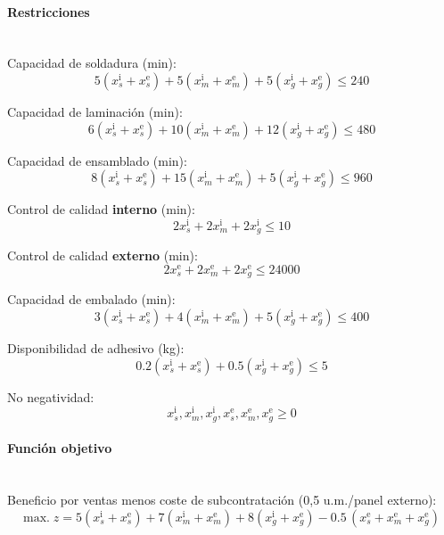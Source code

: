 \paragraph{Restricciones}\mbox{}\\
Capacidad de soldadura (min):
\begin{equation}
5(x_s^{\mathrm{i}}{+}x_s^{\mathrm{e}}) + 5(x_m^{\mathrm{i}}{+}x_m^{\mathrm{e}}) + 5(x_g^{\mathrm{i}}{+}x_g^{\mathrm{e}}) \le 240
\end{equation}

Capacidad de laminación (min):
\begin{equation}
6(x_s^{\mathrm{i}}{+}x_s^{\mathrm{e}}) + 10(x_m^{\mathrm{i}}{+}x_m^{\mathrm{e}}) + 12(x_g^{\mathrm{i}}{+}x_g^{\mathrm{e}}) \le 480
\end{equation}

Capacidad de ensamblado (min):
\begin{equation}
8(x_s^{\mathrm{i}}{+}x_s^{\mathrm{e}}) + 15(x_m^{\mathrm{i}}{+}x_m^{\mathrm{e}}) + 5(x_g^{\mathrm{i}}{+}x_g^{\mathrm{e}}) \le 960
\end{equation}

Control de calidad \textbf{interno} (min):
\begin{equation}
2x_s^{\mathrm{i}} + 2x_m^{\mathrm{i}} + 2x_g^{\mathrm{i}} \le 10
\end{equation}

Control de calidad \textbf{externo} (min):
\begin{equation}
2x_s^{\mathrm{e}} + 2x_m^{\mathrm{e}} + 2x_g^{\mathrm{e}} \le 24000
\end{equation}

Capacidad de embalado (min):
\begin{equation}
3(x_s^{\mathrm{i}}{+}x_s^{\mathrm{e}}) + 4(x_m^{\mathrm{i}}{+}x_m^{\mathrm{e}}) + 5(x_g^{\mathrm{i}}{+}x_g^{\mathrm{e}}) \le 400
\end{equation}

Disponibilidad de adhesivo (kg):
\begin{equation}
0.2(x_s^{\mathrm{i}}{+}x_s^{\mathrm{e}}) + 0.5(x_g^{\mathrm{i}}{+}x_g^{\mathrm{e}}) \le 5
\end{equation}

No negatividad:
\begin{equation}
x_s^{\mathrm{i}},x_m^{\mathrm{i}},x_g^{\mathrm{i}},x_s^{\mathrm{e}},x_m^{\mathrm{e}},x_g^{\mathrm{e}} \ge 0
\end{equation}

\paragraph{Función objetivo}\mbox{}\\
Beneficio por ventas menos coste de subcontratación (0,5 u.m./panel externo):
\begin{equation}
\mbox{max.}\; z = 5(x_s^{\mathrm{i}}{+}x_s^{\mathrm{e}}) + 7(x_m^{\mathrm{i}}{+}x_m^{\mathrm{e}}) + 8(x_g^{\mathrm{i}}{+}x_g^{\mathrm{e}})
- 0.5\,(x_s^{\mathrm{e}} + x_m^{\mathrm{e}} + x_g^{\mathrm{e}})
\end{equation}

